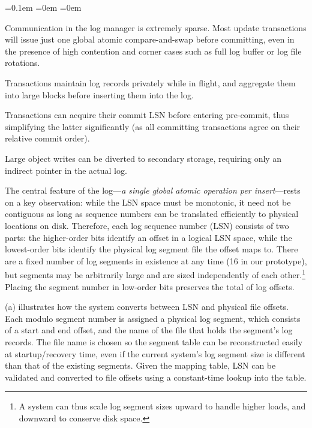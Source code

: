 \setcounter{mycounter}{0}
\begin{list}{.}{\leftmargin=1.4em}
  \itemsep=0.1em
  \parsep=0em
  \parskip=0em
\item Communication in the log manager is extremely sparse. Most update transactions will issue just one global atomic compare-and-swap before committing, even in the presence of high contention and corner cases such as full log buffer or log file rotations.
\item Transactions maintain log records privately while in flight, and aggregate them into large blocks before inserting them into the log.
\item Transactions can acquire their commit LSN before entering pre-commit, thus simplifying the latter significantly (as all committing transactions agree on their relative commit order).
\item Large object writes can be diverted to secondary storage, requiring only an indirect pointer in the actual log.
\end{list}

The central feature of the log---{\em a single global atomic operation per insert}---rests on a key observation: while the LSN space must be monotonic, it need not be contiguous as long as sequence numbers can be translated efficiently to physical locations on disk. Therefore, each log sequence number (LSN) consists of two parts: the higher-order bits identify an offset in a logical LSN space, while the lowest-order bits identify the physical log segment file the offset maps to. There are a fixed number of log segments in existence at any time (16 in our prototype), but segments may be arbitrarily large and are sized independently of each other.\footnote{A system can thus scale log segment sizes upward to handle higher loads, and downward to conserve disk space.} Placing the segment number in low-order bits preserves the total of log offsets.


(a) illustrates how the system converts between LSN and physical file offsets. Each modulo segment number is assigned a physical log segment, which consists of a start and end offset, and the name of the file that holds the segment's log records. The file name is chosen so the segment table can be reconstructed easily at startup/recovery time, even if the current system's log segment size is different than that of the existing segments. Given the mapping table, LSN can be validated and converted to file offsets using a constant-time lookup into the table.

